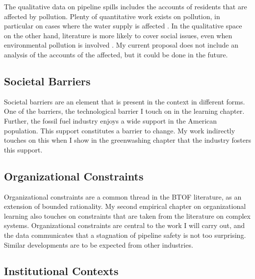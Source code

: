 \documentclass{article}
\begin{document}
The qualitative data on pipeline spills includes the accounts of residents that are affected by pollution. Plenty of quantitative work exists on pollution, in particular on cases where the water supply is affected \citep{Schwarzenbach2010}. In the qualitative space on the other hand, literature is more likely to cover social issues, even when environmental pollution is involved \citep[e.g.,][]{Whiteman2016, Montgomery2019, Ferguson2005}. My current proposal does not include an analysis of the accounts of the affected, but it could be done in the future.

\subsection*{Societal Barriers}
\label{sec:soc}

Societal barriers are an element that is present in the context in different forms. One of the barriers, the technological barrier I touch on in the learning chapter. Further, the fossil fuel industry enjoys a wide support in the American population. This support constitutes a barrier to change. My work indirectly touches on this when I show in the greenwashing chapter that the industry fosters this support. 


\subsection*{Organizational Constraints}

Organizational constraints are a common thread in the BTOF literature, as an extension of bounded rationality. My second empirical chapter on organizational learning also touches on constraints that are taken from the literature on complex systems. Organizational constraints are central to the work I will carry out, and the data communicates that a stagnation of pipeline safety is not too surprising. Similar developments are to be expected from other industries.

\subsection*{Institutional Contexts}
\label{sec:inst}
\end{document}
